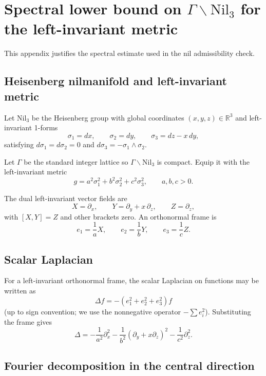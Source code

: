 \documentclass[11pt]{article}
\begin{document}
\appendix
\section{Spectral lower bound on
\texorpdfstring{$\Gamma\backslash\mathrm{Nil}_3$}{Gamma backslash Nil3}
for the left-invariant metric}

This appendix justifies the spectral estimate used in the nil admissibility check.

\subsection{Heisenberg nilmanifold and left-invariant metric}

Let $\mathrm{Nil}_3$ be the Heisenberg group with global coordinates $(x,y,z)\in\mathbb{R}^3$
and left-invariant 1-forms
\[
\sigma_1 = dx,\qquad
\sigma_2 = dy,\qquad
\sigma_3 = dz - x\,dy,
\]
satisfying $d\sigma_1=d\sigma_2=0$ and $d\sigma_3=-\sigma_1\wedge\sigma_2$.

Let $\Gamma$ be the standard integer lattice so $\Gamma\backslash\mathrm{Nil}_3$ is compact.
Equip it with the left-invariant metric
\[
g = a^2\sigma_1^2 + b^2\sigma_2^2 + c^2\sigma_3^2,
\qquad a,b,c>0.
\]

The dual left-invariant vector fields are
\[
X=\partial_x,\qquad
Y=\partial_y + x\,\partial_z,\qquad
Z=\partial_z,
\]
with $[X,Y]=Z$ and other brackets zero.
An orthonormal frame is
\[
e_1=\frac{1}{a}X,\qquad e_2=\frac{1}{b}Y,\qquad e_3=\frac{1}{c}Z.
\]

\subsection{Scalar Laplacian}

For a left-invariant orthonormal frame, the scalar Laplacian on functions may be written as
\[
\Delta f = -(e_1^2+e_2^2+e_3^2)f
\]
(up to sign convention; we use the nonnegative operator $-\sum e_i^2$).
Substituting the frame gives
\begin{equation}
\Delta
=
-\frac{1}{a^2}\partial_x^2
-\frac{1}{b^2}(\partial_y + x\partial_z)^2
-\frac{1}{c^2}\partial_z^2.
\label{eq:nil_laplacian}
\end{equation}

\subsection{Fourier decomposition in the central direction}
\end{document}
